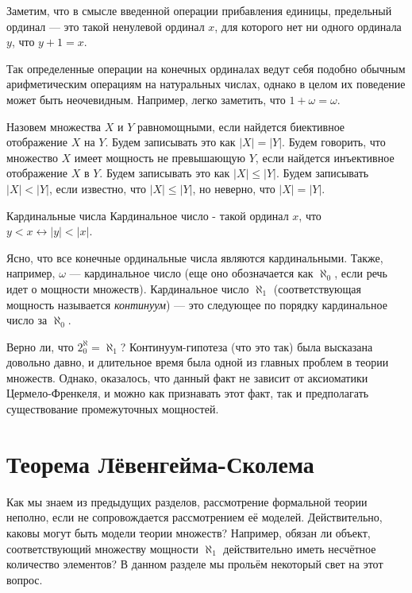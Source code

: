 Заметим, что в смысле введенной операции прибавления единицы, предельный
ординал --- это такой ненулевой ординал $x$, для которого нет ни одного ординала 
$y$, что $y + 1 = x$.

Так определенные операции на конечных ординалах ведут себя подобно
обычным арифметическим операциям на натуральных числах, однако в целом их
поведение может быть неочевидным. Например, легко заметить, что 
$1 + \omega = \omega$.

\begin{definition}
Назовем множества $X$ и $Y$ равномощными, если найдется биективное
отображение $X$ на $Y$. Будем записывать это как $|X| = |Y|$.
Будем говорить, что множество $X$ имеет мощность не превышающую $Y$,
если найдется инъективное отображение $X$ в $Y$. Будем записывать
это как $|X| \le |Y|$. Будем записывать $|X| < |Y|$, если известно,
что $|X| \le |Y|$, но неверно, что $|X| = |Y|$.
\end{definition}

\begin{definition}{Кардинальные числа}
Кардинальное число - такой ординал $x$, что $y < x \leftrightarrow |y| < |x|$.
\end{definition}

Ясно, что все конечные ординальные числа являются кардинальными. 
Также, например, $\omega$ --- кардинальное число 
(еще оно обозначается как $\aleph_0$, если речь идет о мощности множеств).
Кардинальное число $\aleph_1$ (соответствующая мощность называется \emph{континуум}) ---
это следующее по порядку кардинальное число за $\aleph_0$.

Верно ли, что $2^\aleph_0 = \aleph_1$?
Континуум-гипотеза (что это так) была высказана
довольно давно, и длительное время была одной из главных проблем в теории множеств.
Однако, оказалось, что данный факт не зависит от аксиоматики Цермело-Френкеля, и можно
как признавать этот факт, так и предполагать существование промежуточных мощностей.

\section{Теорема Лёвенгейма-Сколема}

Как мы знаем из предыдущих разделов, рассмотрение формальной теории неполно, 
если не сопровождается рассмотрением её моделей. Действительно, каковы могут
быть модели теории множеств? Например, обязан ли объект, соответствующий
множеству мощности $\aleph_1$ действительно иметь несчётное количество
элементов? В данном разделе мы прольём некоторый свет на этот вопрос.

